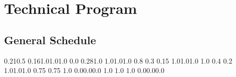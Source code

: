 \chapter{Technical Program}
\vspace{-15mm}
 \section{General Schedule}


  {0.21}{0.5} {0.16}{1.0}{1.0}{1.0}
   {0.0} {0.28}{1.0} {1.0}{1.0}{1.0}
      {0.8} {0.3} {0.15} {1.0}{1.0}{1.0}
 {1.0} {0.4} {0.2} {1.0}{1.0}{1.0}
   {0.75} {0.75} {1.0} {0.0}{0.0}{0.0}
   {1.0} {1.0} {1.0} {0.0}{0.0}{0.0}


\newcommand{\WorkshopsSchedule}[2]{
  \event #1 {0900} {1030} {09:00\\\vspace{0.2em}Workshops #2}        {90~min}                {Wheeler Hall}                   {workshop}
  \event #1 {1030} {1100} {10:30 Break}                              {\vspace{1.5mm}30 min}  {Wheeler Hall}     {break}
  \event #1 {1100} {1230} {11:00\\\vspace{0.2em}Workshops #2}        {90~min}                {Wheeler Hall}                   {workshop}
  \event #1 {1400} {1530} {14:00\\\vspace{0.2em}Workshops #2}        {90~min}                {Wheeler Hall}                   {workshop}
  \event #1 {1530} {1600} {15:30 Break}                              {\vspace{1.5mm}30 min}  {Wheeler Hall}     {break}
  \event #1 {1600} {1730} {16:00\\\vspace{0.2em}Workshops #2}        {90~min}                {Wheeler Hall}                   {workshop}
}

